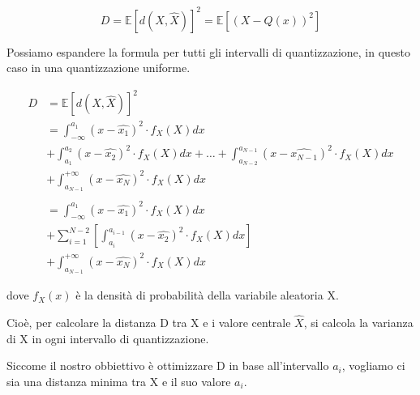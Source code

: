 {
    \Large 
    \begin{equation}
         D 
            =
            \mathbb{E} 
            \left[d (X , \hat{X}) \right]^{2}
            = 
            \mathbb{E} 
            \left[ (X - Q(x) )^{2} \right] 
    \end{equation}
}

Possiamo espandere la formula per tutti gli intervalli di quantizzazione, in questo caso in una quantizzazione uniforme. \newline 

{
    \Large
    \begin{equation}
        \begin{split}
            D 
            &=
            \mathbb{E} 
            \left[d (X , \hat{X}) \right]^{2}
            \\
            &=  
            \int_{- \infty}^{a_1}
            (x - \hat{x_1})^{2} \cdot f_X (X) dx 
            \\
            &+ 
            \int_{a_1}^{a_2}
            (x - \hat{x_2})^{2} \cdot f_X (X) dx 
            + 
            \dots
            +
            \int_{a_{N-2}}^{a_{N-1}}
            (x - \hat{x_{N-1}})^{2} \cdot f_X (X) dx 
            \\
            &+
            \int_{a_{N-1}}^{+ \infty}
            (x - \hat{x_{N}})^{2} \cdot f_X (X) dx  
            \\
            &\quad
            \\
            &=
            \int_{- \infty}^{a_1}
            (x - \hat{x_1})^{2} \cdot f_X (X) dx 
            \\
            &+ 
            \sum_{i = 1}^{N - 2}
            \left[
            \int_{a_i}^{a_{i-1}}
            (x - \hat{x_2})^{2} \cdot f_X (X) dx 
            \right]
            \\
            &+
            \int_{a_{N-1}}^{+ \infty}
            (x - \hat{x_{N}})^{2} \cdot f_X (X) dx  
        \end{split}
    \end{equation}
}

dove $f_X (x)$ è la densità di probabilità della variabile aleatoria X. \newline 

Cioè, per calcolare la distanza D tra X e i valore centrale $\hat{X}$, 
si calcola la varianza di X in ogni intervallo di quantizzazione. \newline 

Siccome il nostro obbiettivo è ottimizzare D in base all'intervallo $a_i$, 
vogliamo ci sia una distanza minima tra X e il suo valore $a_i$. \newline 

